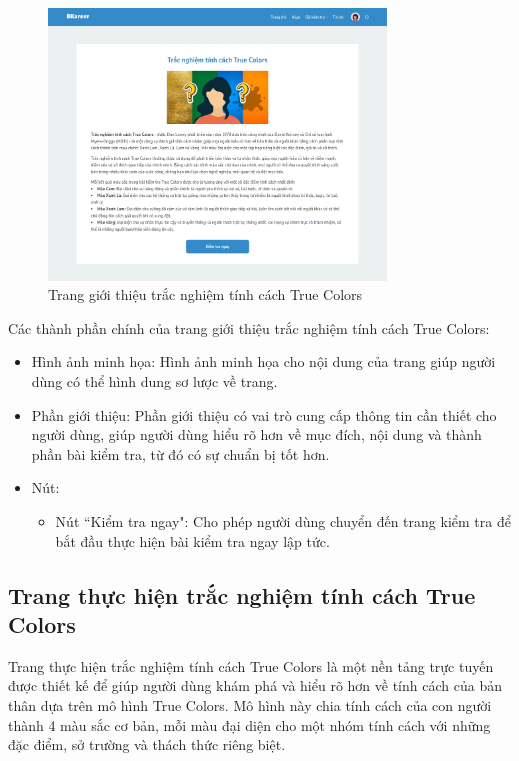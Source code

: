 \begin{figure}[H]
    \centering
    \includegraphics[width=0.8\textwidth]
    {images/chap5/colorsDetail.png}
    \vspace{0.5cm}
    \caption{Trang giới thiệu trắc nghiệm tính cách True Colors}
\end{figure}

Các thành phần chính của trang giới thiệu trắc nghiệm tính cách True Colors:
\begin{itemize}
    \item Hình ảnh minh họa: Hình ảnh minh họa cho nội dung của trang giúp người dùng có thể hình dung sơ lược về trang.
    \item Phần giới thiệu: Phần giới thiệu có vai trò cung cấp thông tin cần thiết cho người dùng, giúp người dùng hiểu rõ hơn về mục đích, nội dung và thành phần bài kiểm tra, từ đó có sự chuẩn bị tốt hơn.
    \item Nút:
        \begin{itemize}
            \item Nút ``Kiểm tra ngay": Cho phép người dùng chuyển đến trang kiểm tra để bắt đầu thực hiện bài kiểm tra ngay lập tức.
        \end{itemize}
\end{itemize}


\subsection{Trang thực hiện trắc nghiệm tính cách True Colors}
Trang thực hiện trắc nghiệm tính cách True Colors là một nền tảng trực tuyến được thiết kế để giúp người dùng khám phá và hiểu rõ hơn về tính cách của bản thân dựa trên mô hình True Colors. Mô hình này chia tính cách của con người thành 4 màu sắc cơ bản, mỗi màu đại diện cho một nhóm tính cách với những đặc điểm, sở trường và thách thức riêng biệt.

